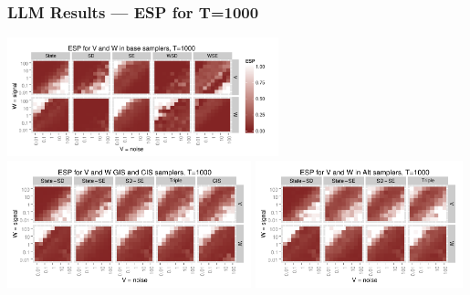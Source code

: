 \documentclass[xcolor=dvipsnames]{beamer}
\begin{document}
\begin{frame}
\frametitle{LLM Results --- ESP for T=1000}
\centering
\includegraphics[width=0.59\textwidth]{basecisESplot1000}\\
\includegraphics[width=0.53\textwidth]{altintESplotV1000}
\includegraphics[width=0.45\textwidth]{altintESplotW1000}
\end{frame}
\end{document}
